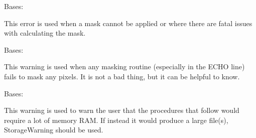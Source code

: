 \documentclass[letterpaper,10pt,english]{sphinxmanual}
\begin{document}

\begin{fulllineitems}
\label{\detokenize{python_docstrings/IfA_Smeargle.meta.errors:IfA_Smeargle.meta.errors.MaskingError}}
Bases: {\hyperref[\detokenize{python_docstrings/IfA_Smeargle.meta.errors:IfA_Smeargle.meta.errors.Smeargle_Exception}]{}}

This error is used when a mask cannot be applied or where there are
fatal issues with calculating the mask.

\end{fulllineitems}


\begin{fulllineitems}
\label{\detokenize{python_docstrings/IfA_Smeargle.meta.errors:IfA_Smeargle.meta.errors.MaskingWarning}}
Bases: {\hyperref[\detokenize{python_docstrings/IfA_Smeargle.meta.errors:IfA_Smeargle.meta.errors.Smeargle_Warning}]{}}

This warning is used when any masking routine (especially in the ECHO
line) fails to mask any pixels. It is not a bad thing, but it can be
helpful to know.

\end{fulllineitems}


\begin{fulllineitems}
\label{\detokenize{python_docstrings/IfA_Smeargle.meta.errors:IfA_Smeargle.meta.errors.MemoryWarning}}
Bases: {\hyperref[\detokenize{python_docstrings/IfA_Smeargle.meta.errors:IfA_Smeargle.meta.errors.Smeargle_Warning}]{}}

This warning is used to warn the user that the procedures that follow
would require a lot of memory RAM. If instead it would produce a large
file(s), StorageWarning should be used.

\end{fulllineitems}
\end{document}
